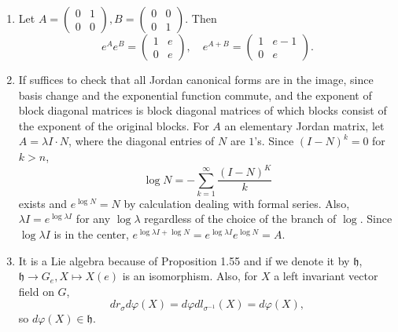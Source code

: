 \begin{enumerate}
\begin{align*}
&=((at-bs)(cs+dt)-(as+bt)(ct-ds)) e_{2}\\
&=(ad-bc)(s^{2}+t^{2}) e_{2}.
\end{align*}
Therefore $f$ is a Lie algebra isomorphism.
For the statement below, consider $(\mathbb{R}^{>0}, \cdot) \times(\mathbb{R},+)$ instead of 3.3(h). 
Then it can be easily checked that $\big\{x \frac{\partial}{\partial x}, x \frac{\partial}{\partial y}\big\}$ is left invariant tangent fields that satisfies
\[\left[x \frac{\partial}{\partial x}, x \frac{\partial}{\partial y}\right]=x \frac{\partial}{\partial y}.\]
Therefore, by Theorem 3.27, Corollary, it is (up to isomorphism) the unique simply connected $2$-dimensional non-abelian Lie group.
\item Let $A=\begin{pmatrix}0 & 1 \\ 0 & 0\end{pmatrix}, B=\begin{pmatrix}0 & 0 \\ 0 & 1\end{pmatrix}$. Then
\[e^{A} e^{B}=\begin{pmatrix}1 & e \\ 0 & e\end{pmatrix}, \quad 
e^{A+B}=\begin{pmatrix}1 & e-1 \\ 0 & e\end{pmatrix}.\]
\item If suffices to check that all Jordan canonical forms are in the image, 
since basis change and the exponential function commute, 
and the exponent of block diagonal matrices is block diagonal matrices of which blocks consist of the exponent of the original blocks. 
For $A$ an elementary Jordan matrix, let $A=\lambda I \cdot N$, where the diagonal entries of $N$ are $1$'s. 
Since $(I-N)^{k}=0$ for $k>n$,
\[\log N=-\sum_{k=1}^{\infty} \frac{(I-N)^{K}}{k}\]
exists and $e^{\log N}=N$ by calculation dealing with formal series. 
Also, $\lambda I=e^{\log \lambda I}$ for any $\log \lambda$ regardless of the choice of the branch of $\log$. 
Since $\log \lambda I$ is in the center, $e^{\log \lambda I+\log N}=e^{\log \lambda I} e^{\log N}=A$.
\item It is a Lie algebra because of Proposition 1.55 and if we denote it by $\mathfrak{h}$, 
$\mathfrak{h} \rightarrow G_{e}, X \mapsto X(e)$ is an isomorphism. 
Also, for $X$ a left invariant vector field on $G$,
\[dr_{\sigma} d\varphi(X)=d\varphi dl_{\sigma^{-1}}(X)=d\varphi(X),\]
so $d\varphi(X) \in \mathfrak{h}$. 

\end{enumerate}
